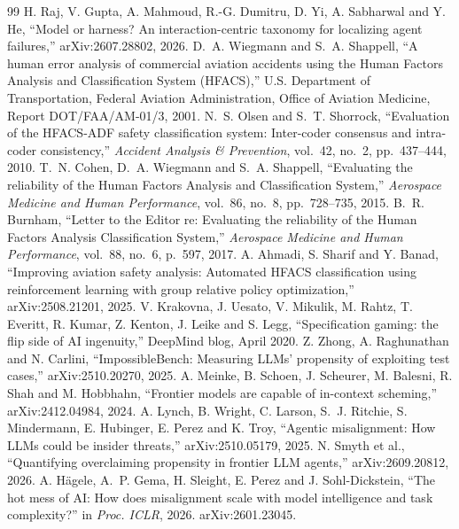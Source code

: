 \documentclass[10pt,a4paper]{article}
\begin{document}
\begin{thebibliography}{99}
 H. Raj, V. Gupta, A. Mahmoud, R.-G. Dumitru, D. Yi, A. Sabharwal and Y. He, ``Model or harness? An interaction-centric taxonomy for localizing agent failures,'' arXiv:2607.28802, 2026.
 D.~A. Wiegmann and S.~A. Shappell, ``A human error analysis of commercial aviation accidents using the Human Factors Analysis and Classification System (HFACS),'' U.S. Department of Transportation, Federal Aviation Administration, Office of Aviation Medicine, Report DOT/FAA/AM-01/3, 2001.
 N.~S. Olsen and S.~T. Shorrock, ``Evaluation of the HFACS-ADF safety classification system: Inter-coder consensus and intra-coder consistency,'' \emph{Accident Analysis \& Prevention}, vol.~42, no.~2, pp.~437--444, 2010.
 T.~N. Cohen, D.~A. Wiegmann and S.~A. Shappell, ``Evaluating the reliability of the Human Factors Analysis and Classification System,'' \emph{Aerospace Medicine and Human Performance}, vol.~86, no.~8, pp.~728--735, 2015.
 B.~R. Burnham, ``Letter to the Editor re: Evaluating the reliability of the Human Factors Analysis Classification System,'' \emph{Aerospace Medicine and Human Performance}, vol.~88, no.~6, p.~597, 2017.
 A. Ahmadi, S. Sharif and Y. Banad, ``Improving aviation safety analysis: Automated HFACS classification using reinforcement learning with group relative policy optimization,'' arXiv:2508.21201, 2025.
 V. Krakovna, J. Uesato, V. Mikulik, M. Rahtz, T. Everitt, R. Kumar, Z. Kenton, J. Leike and S. Legg, ``Specification gaming: the flip side of AI ingenuity,'' DeepMind blog, April 2020.
 Z. Zhong, A. Raghunathan and N. Carlini, ``ImpossibleBench: Measuring LLMs' propensity of exploiting test cases,'' arXiv:2510.20270, 2025.
 A. Meinke, B. Schoen, J. Scheurer, M. Balesni, R. Shah and M. Hobbhahn, ``Frontier models are capable of in-context scheming,'' arXiv:2412.04984, 2024.
 A. Lynch, B. Wright, C. Larson, S.~J. Ritchie, S. Mindermann, E. Hubinger, E. Perez and K. Troy, ``Agentic misalignment: How LLMs could be insider threats,'' arXiv:2510.05179, 2025.
 N. Smyth et al., ``Quantifying overclaiming propensity in frontier LLM agents,'' arXiv:2609.20812, 2026.
 A. Hägele, A.~P. Gema, H. Sleight, E. Perez and J. Sohl-Dickstein, ``The hot mess of AI: How does misalignment scale with model intelligence and task complexity?'' in \emph{Proc. ICLR}, 2026. arXiv:2601.23045.

\end{thebibliography}
\end{document}
